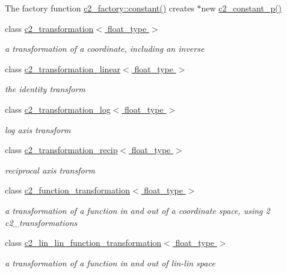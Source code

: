 \begin{DoxyCompactItemize}
\begin{DoxyCompactList}
The factory function \hyperlink{classc2__factory_a98e385b2b927d15d4376821302061d4d}{c2\-\_\-factory\-::constant()} creates $\ast$new \hyperlink{classc2__constant__p}{c2\-\_\-constant\-\_\-p()} \end{DoxyCompactList}\item 
class \hyperlink{classc2__transformation}{c2\-\_\-transformation$<$ float\-\_\-type $>$}
\begin{DoxyCompactList}\small\item\em a transformation of a coordinate, including an inverse \end{DoxyCompactList}\item 
class \hyperlink{classc2__transformation__linear}{c2\-\_\-transformation\-\_\-linear$<$ float\-\_\-type $>$}
\begin{DoxyCompactList}\small\item\em the identity transform \end{DoxyCompactList}\item 
class \hyperlink{classc2__transformation__log}{c2\-\_\-transformation\-\_\-log$<$ float\-\_\-type $>$}
\begin{DoxyCompactList}\small\item\em log axis transform \end{DoxyCompactList}\item 
class \hyperlink{classc2__transformation__recip}{c2\-\_\-transformation\-\_\-recip$<$ float\-\_\-type $>$}
\begin{DoxyCompactList}\small\item\em reciprocal axis transform \end{DoxyCompactList}\item 
class \hyperlink{classc2__function__transformation}{c2\-\_\-function\-\_\-transformation$<$ float\-\_\-type $>$}
\begin{DoxyCompactList}\small\item\em a transformation of a function in and out of a coordinate space, using 2 c2\-\_\-transformations \end{DoxyCompactList}\item 
class \hyperlink{classc2__lin__lin__function__transformation}{c2\-\_\-lin\-\_\-lin\-\_\-function\-\_\-transformation$<$ float\-\_\-type $>$}
\begin{DoxyCompactList}\small\item\em a transformation of a function in and out of lin-\/lin space \end{DoxyCompactList}\item 

\end{DoxyCompactItemize}
